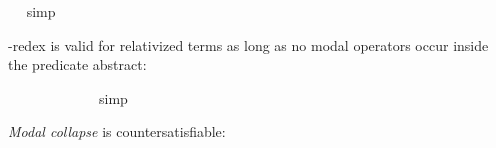 \begin{isabellebody}
\ %
%
\isamarkupfalse%
\ simp%
%
%
%
\begin{isamarkuptext}%
\isa{{\isasymbeta}{\isasymeta}}-redex is valid for relativized terms as long as no modal operators occur inside the predicate abstract:%
\end{isamarkuptext}\isamarkuptrue%
\ \ \isamarkupfalse%
\ {\isachardoublequoteopen}{\isasymlfloor}{\isacharparenleft}{\isacharparenleft}{\isasymlambda}{\isasymalpha}{\isachardot}\ {\isasymphi}\ {\isasymalpha}{\isacharparenright}\ {\isasymdownharpoonleft}{\isacharparenleft}{\isasymtau}{\isacharcolon}{\isacharcolon}{\isasymup}{\isasymzero}{\isacharparenright}{\isacharparenright}\ \isactrlbold {\isasymleftrightarrow}\ {\isacharparenleft}{\isasymphi}\ {\isasymdownharpoonleft}{\isasymtau}{\isacharparenright}{\isasymrfloor}{\isachardoublequoteclose}%
\ %
%
\isamarkupfalse%
\ simp%
%
%
\isanewline
\ \ \isamarkupfalse%
\ {\isachardoublequoteopen}{\isasymlfloor}{\isacharparenleft}{\isacharparenleft}{\isasymlambda}{\isasymalpha}{\isachardot}\ \isactrlbold {\isasymbox}{\isasymphi}\ {\isasymalpha}{\isacharparenright}\ {\isasymdownharpoonleft}{\isacharparenleft}{\isasymtau}{\isacharcolon}{\isacharcolon}{\isasymup}{\isasymzero}{\isacharparenright}{\isacharparenright}\ \isactrlbold {\isasymleftrightarrow}\ {\isacharparenleft}\isactrlbold {\isasymbox}{\isasymphi}\ {\isasymdownharpoonleft}{\isasymtau}{\isacharparenright}{\isasymrfloor}{\isachardoublequoteclose}\ \isamarkupfalse%
%
\ %
%
\isamarkupfalse%
\ %
%
%
%
\isanewline
\ \ \isamarkupfalse%
\ {\isachardoublequoteopen}{\isasymlfloor}{\isacharparenleft}{\isacharparenleft}{\isasymlambda}{\isasymalpha}{\isachardot}\ \isactrlbold {\isasymdiamond}{\isasymphi}\ {\isasymalpha}{\isacharparenright}\ {\isasymdownharpoonleft}{\isacharparenleft}{\isasymtau}{\isacharcolon}{\isacharcolon}{\isasymup}{\isasymzero}{\isacharparenright}{\isacharparenright}\ \isactrlbold {\isasymleftrightarrow}\ {\isacharparenleft}\isactrlbold {\isasymdiamond}{\isasymphi}\ {\isasymdownharpoonleft}{\isasymtau}{\isacharparenright}{\isasymrfloor}{\isachardoublequoteclose}\ \isamarkupfalse%
%
\ %
%
\isamarkupfalse%
\ %
%
%
%
%
\begin{isamarkuptext}%
\emph{Modal collapse} is countersatisfiable:%
\end{isamarkuptext}\isamarkuptrue%
\ \ \isamarkupfalse%
\ {\isachardoublequoteopen}{\isasymlfloor}{\isasymphi}\ \isactrlbold {\isasymrightarrow}\ \isactrlbold {\isasymbox}{\isasymphi}{\isasymrfloor}{\isachardoublequoteclose}\ \isamarkupfalse%

\end{isabellebody}
